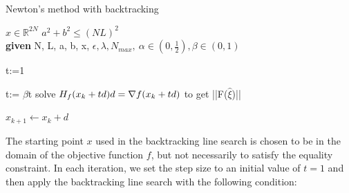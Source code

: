 \documentclass[10pt,a4paper,notitlepage,twocolumn]{article}
\begin{document}
\begin{algorithm}[htbp]
\caption{Newton's method with backtracking}\label{alg:newton}
\label{NoBT}
\begin{algorithmic}[1]
\Require $x \in \mathbb{R}^{2N}$
\Ensure $a^2 + b^2 \leq (NL)^2$\\
\textbf{given} N, L, a, b, x, $\epsilon, \lambda, N_{max},\ \alpha \in (0, \frac{1}{2}),\beta \in (0,1)$ 

    \State t:=1
    
    t:= $\beta$t
    \State solve $H_f(x_k + td)d = \- \nabla f(x_k + td)$ to get ||F($\hat\xi$)||
    \EndWhile
    
    \State $x_{k+1} \gets x_k + d$

\EndWhile
\end{algorithmic}
\end{algorithm}

The starting point $x$ used in the backtracking line search is chosen to be in the domain of the objective function $f$, but not necessarily to satisfy the equality constraint. In each iteration, we set the step size to an initial value of $t=1$ and then apply the backtracking line search with the following condition:

\end{document}
